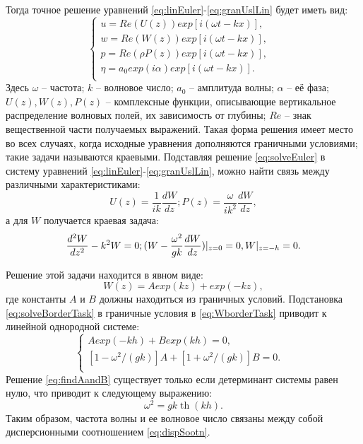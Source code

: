 Тогда точное решение уравнений \eqref{eq:linEuler}-\eqref{eq:granUslLin} будет иметь вид:
\begin{equation}\label{eq:solveEuler}
  \begin{cases}
  u=Re(U(z))exp[i(\omega t-kx)], & \\
  w=Re(W(z))exp[i(\omega t-kx)], & \\
  p=Re(\rho P(z))exp[i(\omega t-kx)], & \\
  \eta = a_0exp(i\alpha)exp[i(\omega t-kx)]. & \\
  \end{cases}
\end{equation}
Здесь $\omega$ -- частота; $k$ -- волновое число; $a_0$ -- амплитуда волны; $\alpha$ -- её фаза; $U(z),W(z), P(z)$ -- комплексные функции, описывающие вертикальное распределение волновых полей, их зависимость от глубины; $Re$ -- знак вещественной части получаемых выражений. Такая форма решения имеет место во всех случаях, когда исходные уравнения дополняются граничными условиями; такие задачи называются краевыми. Подставляя решение \eqref{eq:solveEuler} в систему уравнений \eqref{eq:linEuler}-\eqref{eq:granUslLin}, можно найти связь между различными характеристиками:
\begin{equation}\label{eq:connCharac}
  U(z)=\frac{1}{ik}\frac{dW}{dz}; P(z)=\frac{\omega}{ik^2}\frac{dW}{dz},
\end{equation}
а для $W$ получается краевая задача:
\begin{equation}\label{eq:WborderTask}
  \frac{d^2W}{dz^2}-k^2W=0; \\
  (W-\frac{\omega^2}{gk}\frac{dW}{dz})|_{z=0}=0,W|_{z=-h}=0.
\end{equation}

Решение этой задачи находится в явном виде:
\begin{equation}\label{eq:solveBorderTask}
W(z)=Aexp(kz)+exp(-kz),
\end{equation}
\noindent
где константы $A$ и $B$ должны находиться из граничных условий. Подстановка \eqref{eq:solveBorderTask} в граничные условия в \eqref{eq:WborderTask} приводит к линейной однородной системе:
\begin{equation}\label{eq:findAandB}
  \begin{cases}
  Aexp(-kh)+Bexp(kh)=0,& \\
  [1-\omega^2/(gk)]A+[1+\omega^2/(gk)]B=0. & \\
  \end{cases}
\end{equation}
Решение \eqref{eq:findAandB} существует только если детерминант системы равен нулю, что приводит к следующему выражению:
\begin{equation}\label{eq:dispSootn}
  \omega^2=gk \operatorname{th} (kh).
\end{equation}
Таким образом, частота волны и ее волновое число связаны между собой дисперсионными соотношением \eqref{eq:dispSootn}.

